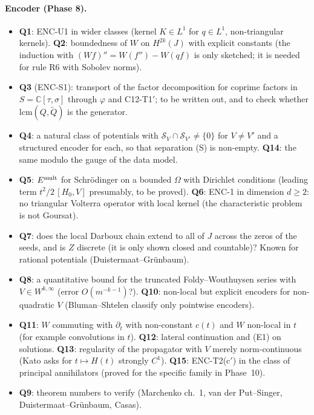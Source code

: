 \documentclass[11pt]{article}
\theoremstyle{plain}
\theoremstyle{definition}
\theoremstyle{remark}
\newcommand{\C}{\mathbb{C}}
\begin{document}
\paragraph{Encoder (Phase 8).}
\begin{itemize}
\item \textbf{Q1}: ENC-U1 in wider classes (kernel $K\in L^1$ for $q\in L^1$, non-triangular kernels). \textbf{Q2}: boundedness of $W$ on $H^{2k}(J)$ with explicit constants (the induction with $(Wf)''=W(f'')-W(qf)$ is only sketched; it is needed for rule R6 with Sobolev norms).
\item \textbf{Q3} (ENC-S1): transport of the factor decomposition for coprime factors in $S=\C[\tau,\sigma]$ through $\varphi$ and C12-T1$'$; to be written out, and to check whether $\mathrm{lcm}(Q,\tilde Q)$ is the generator.
\item \textbf{Q4}: a natural class of potentials with $\mathcal S_V\cap\mathcal S_{V'}\ne\{0\}$ for $V\ne V'$ and a structured encoder for each, so that separation (S) is non-empty. \textbf{Q14}: the same modulo the gauge of the data model.
\item \textbf{Q5}: $E^{\rm mult}$ for Schr\"odinger on a bounded $\Omega$ with Dirichlet conditions (leading term $t^2/2\,[H_0,V]$ presumably, to be proved). \textbf{Q6}: ENC-1 in dimension $d\ge2$: no triangular Volterra operator with local kernel (the characteristic problem is not Goursat).
\item \textbf{Q7}: does the local Darboux chain extend to all of $J$ across the zeros of the seeds, and is $Z$ discrete (it is only shown closed and countable)? Known for rational potentials (Duistermaat--Gr\"unbaum).
\item \textbf{Q8}: a quantitative bound for the truncated Foldy--Wouthuysen series with $V\in W^{k,\infty}$ (error $O(m^{-k-1})$?). \textbf{Q10}: non-local but explicit encoders for non-quadratic $V$ (Bluman--Shtelen classify only pointwise encoders).
\item \textbf{Q11}: $W$ commuting with $\partial_t$ with non-constant $c(t)$ and $W$ non-local in $t$ (for example convolutions in $t$). \textbf{Q12}: lateral continuation and (E1) on solutions. \textbf{Q13}: regularity of the propagator with $V$ merely norm-continuous (Kato asks for $t\mapsto H(t)$ strongly $C^1$). \textbf{Q15}: ENC-T2(c$'$) in the class of principal annihilators (proved for the specific family in Phase~10).
\item \textbf{Q9}: theorem numbers to verify (Marchenko ch.~1, van der Put--Singer, Duistermaat--Gr\"unbaum, Casas).
\end{itemize}
\end{document}
